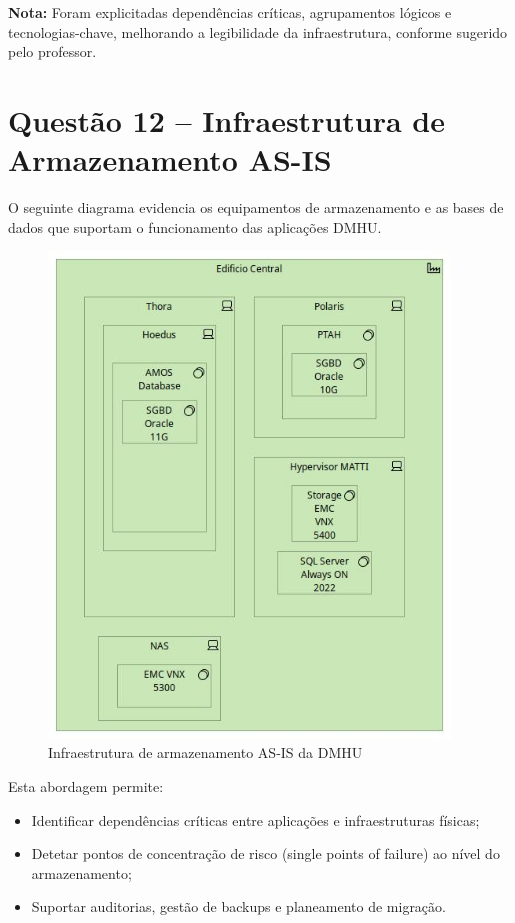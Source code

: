 \documentclass[12pt,a4paper,final]{article}
\begin{document}
    \textbf{Nota:} Foram explicitadas dependências críticas, agrupamentos lógicos e tecnologias-chave, melhorando a legibilidade da infraestrutura, conforme sugerido pelo professor.

    \section*{Questão 12 – Infraestrutura de Armazenamento AS-IS}

    O seguinte diagrama evidencia os equipamentos de armazenamento e as bases de dados que suportam o funcionamento das aplicações DMHU.

    \begin{figure}[H]
        \centering
        \includegraphics[width=0.95\textwidth]{Q12 - Storage Infraestructure As-Is.jpg}
        \caption{Infraestrutura de armazenamento AS-IS da DMHU}
        \label{fig:q12-storage}
    \end{figure}

    Esta abordagem permite:
    \begin{itemize}
        \item Identificar dependências críticas entre aplicações e infraestruturas físicas;
        \item Detetar pontos de concentração de risco (single points of failure) ao nível do armazenamento;
        \item Suportar auditorias, gestão de backups e planeamento de migração.
    \end{itemize}
\end{document}
